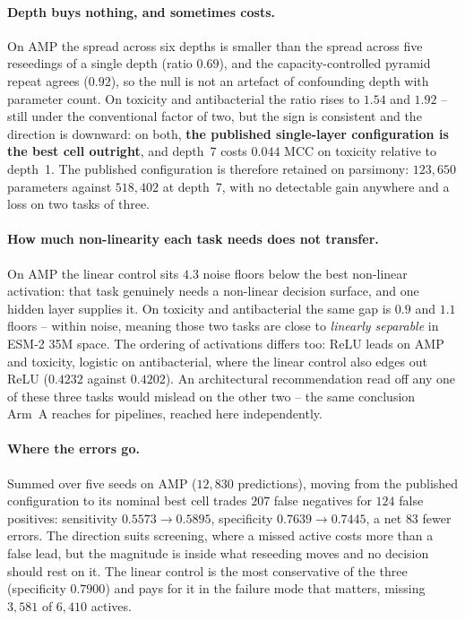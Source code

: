 \documentclass[11pt,a4paper]{article}
\begin{document}
\paragraph{Depth buys nothing, and sometimes costs.} On AMP the spread across six depths is
smaller than the spread across five reseedings of a single depth (ratio $0.69$), and the
capacity-controlled pyramid repeat agrees ($0.92$), so the null is not an artefact of
confounding depth with parameter count. On toxicity and antibacterial the ratio rises to
$1.54$ and $1.92$ -- still under the conventional factor of two, but the sign is consistent
and the direction is downward: on both, \textbf{the published single-layer configuration is
the best cell outright}, and depth~7 costs $0.044$ MCC on toxicity relative to depth~1. The
published configuration is therefore retained on parsimony: $123{,}650$ parameters against
$518{,}402$ at depth~7, with no detectable gain anywhere and a loss on two tasks of three.

\paragraph{How much non-linearity each task needs does not transfer.} On AMP the linear
control sits $4.3$ noise floors below the best non-linear activation: that task genuinely
needs a non-linear decision surface, and one hidden layer supplies it. On toxicity and
antibacterial the same gap is $0.9$ and $1.1$ floors -- within noise, meaning those two
tasks are close to \emph{linearly separable} in ESM-2 35M space. The ordering of
activations differs too: ReLU leads on AMP and toxicity, logistic on antibacterial, where
the linear control also edges out ReLU ($0.4232$ against $0.4202$). An architectural
recommendation read off any one of these three tasks would mislead on the other two --
the same conclusion Arm~A reaches for pipelines, reached here independently.

\paragraph{Where the errors go.} Summed over five seeds on AMP ($12{,}830$ predictions),
moving from the published configuration to its nominal best cell trades $207$ false
negatives for $124$ false positives: sensitivity $0.5573 \to 0.5895$, specificity
$0.7639 \to 0.7445$, a net $83$ fewer errors. The direction suits screening, where a missed
active costs more than a false lead, but the magnitude is inside what reseeding moves and
no decision should rest on it. The linear control is the most conservative of the three
(specificity $0.7900$) and pays for it in the failure mode that matters, missing $3{,}581$
of $6{,}410$ actives.
\end{document}
